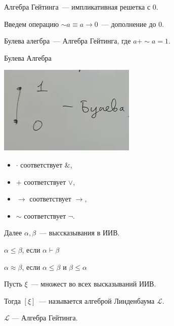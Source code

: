 \begin{definition}
    Алгебра Гейтинга~--- импликативная решетка с 0.

    Введем операцию $\sim a \equiv a \to 0$~--- дополнение до 0.
\end{definition}

\begin{definition}
    Булева алегбра~--- Алгебра Гейтинга, где $a + \sim a = 1$.
\end{definition}

\begin{example}
    Булева Алгебра

    \includegraphics[scale=0.8]{img/bool_algebra}
    
    \begin{itemize}
        \item $\cdot$ соответствует $\&$,
        \item $+$ соответствует $\vee$,
        \item $\to$ соответствует $\to$,
        \item $\sim$ соответствует $\neg$.
    \end{itemize}
\end{example}

Далее $\alpha, \beta$~--- выссказывания в ИИВ.

\begin{definition}
    $\alpha \leqslant \beta$, если $\alpha \vdash \beta$
\end{definition}

\begin{definition}
    $\alpha \approx \beta$, если $\alpha \leqslant \beta$ и $\beta \leqslant \alpha$
\end{definition}

\begin{definition}
    Пусть $\xi$~--- множест во всех высказываний ИИВ.
    
    Тогда $[ \xi ]$~--- называется алгеброй Линденбаума $\mathcal{L}$.
\end{definition}

\begin{theorem}
    $\mathcal{L}$ --- Алгебра Гейтинга.
\end{theorem}

